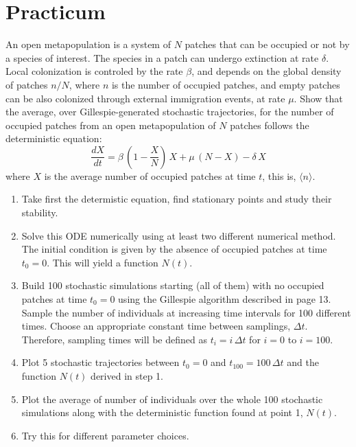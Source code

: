 \documentclass{article}
\begin{document}
\section{Practicum}
An open metapopulation is a system of $N$ patches that can be occupied or not by a species of interest. The species in a patch can undergo extinction at rate $\delta$. Local colonization is controled by the rate $\beta$, and depends on the global density of patches $n/N$, where $n$ is the number of occupied patches, and empty patches can be also colonized through external immigration events, at rate $\mu$. Show that the average, over Gillespie-generated stochastic trajectories, for the number of occupied patches from an open metapopulation of $N$ patches follows the deterministic equation: 
\begin{equation}
\frac{dX}{dt} = \beta\,\left(1-\frac{X}{N}\right)\,X + \mu\,(N-X) - \delta\, X
\end{equation}
where $X$ is the average number of occupied patches at time $t$, this is, $\langle n \rangle$. 

\begin{enumerate}
	\item Take first the determistic equation, find stationary points and study their stability.	
	\item Solve this ODE numerically using at least two different numerical method. The initial condition is given by the absence of occupied patches at time $t_0 = 0$. This will yield a function $N(t)$. 
	\item Build 100 stochastic simulations starting (all of them) with no occupied patches at time $t_0 = 0$ using the Gillespie algorithm described in page 13. Sample the number of individuals at increasing time intervals for 100 different times. Choose an appropriate constant time between samplings, $\Delta t$. Therefore, sampling times will be defined as $t_i = i\,\Delta t$ for $i=0$ to $i=100$.   
	\item Plot 5 stochastic trajectories between $t_0=0$ and $t_{100} = 100\,\Delta t$ and the function $N(t)$ derived in step 1. 
	\item Plot the average of number of individuals over the whole 100 stochastic simulations along with the deterministic function found at point 1, $N(t)$. 
	\item Try this for different parameter choices. 
\end{enumerate}
\end{document}

